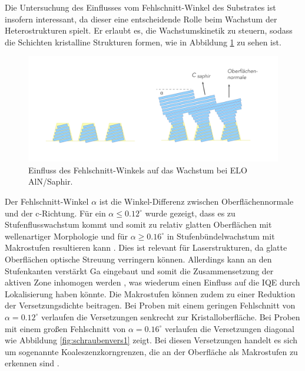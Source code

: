\noindent
Die Untersuchung des Einflusses vom Fehlschnitt-Winkel des Substrates ist insofern interessant, da dieser eine entscheidende Rolle beim Wachstum der Heterostrukturen spielt. Er erlaubt es, die Wachstumskinetik zu steuern, sodass die Schichten kristalline Strukturen formen, wie in Abbildung \ref{fig:offcut} zu sehen ist.
\newline
\begin{figure}[H]
\includegraphics[width=\linewidth]{Bilder/offcut.png}
\caption{Einfluss des Fehlschnitt-Winkels auf das Wachstum bei ELO AlN/Saphir.}
\label{fig:offcut}
\end{figure}
\noindent 
Der Fehlschnitt-Winkel $\alpha$ ist die Winkel-Differenz zwischen Oberflächennormale und der c-Richtung. Für ein $\alpha \leq 0.12^\circ $ wurde gezeigt, dass es zu Stufenflusswachstum kommt und somit zu relativ glatten Oberflächen mit wellenartiger Morphologie und für $\alpha \geq 0.16^\circ $ in Stufenbündelwachstum mit Makrostufen resultieren kann \cite{MOGILATENKO2014222}. Dies ist relevant für Laserstrukturen, da glatte Oberflächen optische Streuung verringern können. Allerdings kann an den Stufenkanten verstärkt Ga eingebaut und somit die Zusammensetzung der aktiven Zone inhomogen werden \cite{zeimeru} \cite{MOGILATENKO2014222} \cite{fmehnke}, was wiederum einen Einfluss auf die IQE durch Lokalisierung haben könnte.
\newline
Die Makrostufen können zudem zu einer Reduktion der Versetzungsdichte beitragen. Bei Proben mit einem geringen Fehlschnitt von $\alpha = 0.12^\circ $ verlaufen die Versetzungen senkrecht zur Kristalloberfläche. Bei Proben mit einem großen Fehlschnitt von $\alpha = 0.16^\circ $ verlaufen die Versetzungen diagonal wie Abbildung \ref{fig:schraubenvers1} zeigt. Bei diesen Versetzungen handelt es sich um sogenannte Koaleszenzkorngrenzen, die an der Oberfläche als Makrostufen zu erkennen sind \cite{MOGILATENKO2014222}. 
